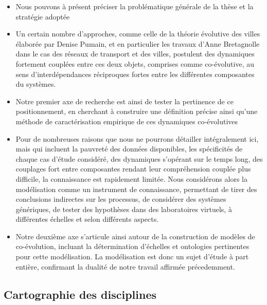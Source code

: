 \documentclass[11pt]{article}
\begin{document}
\begin{itemize}
	\item Nous pouvons à présent préciser la problématique générale de la thèse et la stratégie adoptée
	\item Un certain nombre d'approches, comme celle de la théorie évolutive des villes élaborée par Denise Pumain, et en particulier les travaux d'Anne Bretagnolle dans le cas des réseaux de transport et des villes, postulent des dynamiques fortement couplées entre ces deux objets, comprises comme co-évolutive, au sens d'interdépendances réciproques fortes entre les différentes composantes du systèmes.
	\item Notre premier axe de recherche est ainsi de tester la pertinence de ce positionnement, en cherchant à construire une définition précise ainsi qu'une méthode de caractérisation empirique de ces dynamiques co-évolutives
	\item Pour de nombreuses raisons que nous ne pourrons détailler intégralement ici, mais qui incluent la pauvreté des données disponibles, les spécificités de chaque cas d'étude considéré, des dynamiques s'opérant sur le temps long, des couplages fort entre composantes rendant leur compréhension couplée plus difficile, la connaissance est rapidement limitée. Nous considérons alors la modélisation comme un instrument de connaissance, permettant de tirer des conclusions indirectes sur les processus, de considérer des systèmes génériques, de tester des hypothèses dans des laboratoires virtuels, à différentes échelles et selon différents aspects.
	\item Notre deuxième axe s'articule ainsi autour de la construction de modèles de co-évolution, incluant la détermination d'échelles et ontologies pertinentes pour cette modélisation. La modélisation est donc un sujet d'étude à part entière, confirmant la dualité de notre travail affirmée précedemment. 
\end{itemize}


\subsection*{Cartographie des disciplines}

\end{document}
